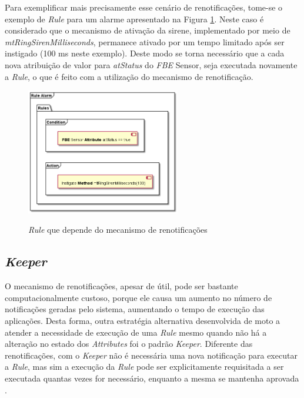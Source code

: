 \FloatBarrier

Para exemplificar mais precisamente esse cenário de renotificações, tome-se o
exemplo de \textit{Rule} para um alarme apresentado na Figura
\ref{fig:ex_rule_renotif}. Neste caso é considerado que o mecanismo de ativação
da sirene, implementado por meio de \textit{mtRingSirenMilliseconds}, permanece
ativado por um tempo limitado após ser instigado (100 ms neste exemplo). Deste
modo se torna necessário que a cada nova atribuição de valor para
\textit{atStatus} do \textit{FBE} Sensor, seja executada novamente a
\textit{Rule}, o que é feito com a utilização do mecanismo de renotificação.

\begin{figure}[!htb]
  \centering
  \caption{\textit{Rule} que depende do mecanismo de renotificações}
  \includegraphics[width=0.6\textwidth]{../out/diagrams/rule_renotif/rules_renotif.png}
  \smallskip
  \label{fig:ex_rule_renotif}
\end{figure}

\subsection{\textit{Keeper}}

O mecanismo de renotificações, apesar de útil, pode ser bastante
computacionalmente custoso, porque ele causa um aumento no número de
notificações geradas pelo sistema, aumentando o tempo de execução das
aplicações. Desta forma, outra estratégia alternativa desenvolvida de moto a
atender a necessidade de execução de uma \textit{Rule} mesmo quando não há a
alteração no estado dos \textit{Attributes} foi o padrão \textit{Keeper}.
Diferente das renotificações, com o \textit{Keeper} não é necessária uma nova
notificação para executar a \textit{Rule}, mas sim a execução da \textit{Rule}
pode ser explicitamente requisitada a ser executada quantas vezes for
necessário, enquanto a mesma se mantenha aprovada \cite{muchalski_2012}.

